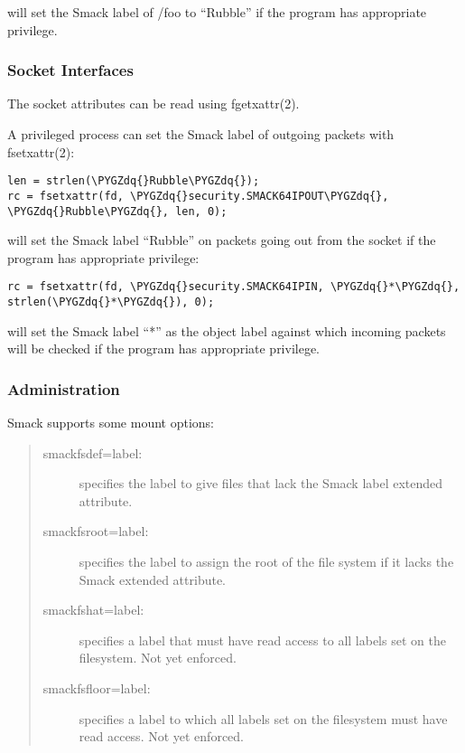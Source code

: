 \documentclass[a4paper,8pt,english]{sphinxmanual}
\def\PYGZdq{\char`\"}
\begin{document}
will set the Smack label of /foo to ``Rubble'' if the program has appropriate
privilege.


\subsubsection{Socket Interfaces}
\label{admin-guide/LSM/Smack:socket-interfaces}
The socket attributes can be read using fgetxattr(2).

A privileged process can set the Smack label of outgoing packets with
fsetxattr(2):

\begin{Verbatim}[commandchars=\\\{\}]
len = strlen(\PYGZdq{}Rubble\PYGZdq{});
rc = fsetxattr(fd, \PYGZdq{}security.SMACK64IPOUT\PYGZdq{}, \PYGZdq{}Rubble\PYGZdq{}, len, 0);
\end{Verbatim}

will set the Smack label ``Rubble'' on packets going out from the socket if the
program has appropriate privilege:

\begin{Verbatim}[commandchars=\\\{\}]
rc = fsetxattr(fd, \PYGZdq{}security.SMACK64IPIN, \PYGZdq{}*\PYGZdq{}, strlen(\PYGZdq{}*\PYGZdq{}), 0);
\end{Verbatim}

will set the Smack label ``*'' as the object label against which incoming
packets will be checked if the program has appropriate privilege.


\subsubsection{Administration}
\label{admin-guide/LSM/Smack:administration}
Smack supports some mount options:
\begin{quote}
\begin{description}
\item[{smackfsdef=label:}] \leavevmode
specifies the label to give files that lack
the Smack label extended attribute.

\item[{smackfsroot=label:}] \leavevmode
specifies the label to assign the root of the
file system if it lacks the Smack extended attribute.

\item[{smackfshat=label:}] \leavevmode
specifies a label that must have read access to
all labels set on the filesystem. Not yet enforced.

\item[{smackfsfloor=label:}] \leavevmode
specifies a label to which all labels set on the
filesystem must have read access. Not yet enforced.

\end{description}
\end{quote}
\end{document}
